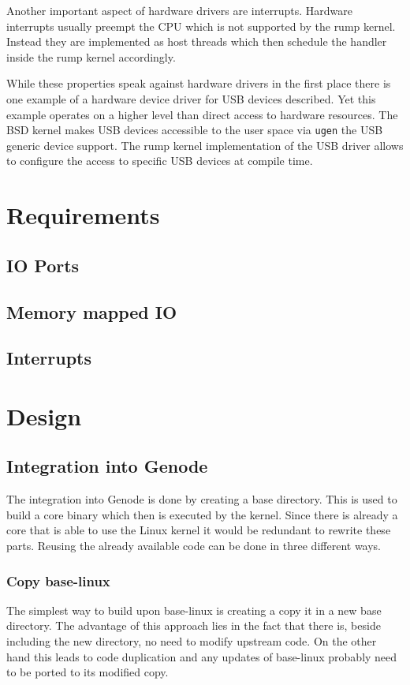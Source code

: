 \documentclass[
a4paper,
12pt,
notitlepage,
parskip=half,
DIV=11,
]{scrbook}
\begin{document}
		Another important aspect of hardware drivers are interrupts.
		Hardware interrupts usually preempt the CPU which is not supported by the rump kernel.
		Instead they are implemented as host threads which then schedule the handler inside the rump kernel accordingly. \citep{kantee}
		
		While these properties speak against hardware drivers in the first place there is one example of a hardware device driver for USB devices described.
		Yet this example operates on a higher level than direct access to hardware resources.
		The BSD kernel makes USB devices accessible to the user space via \texttt{ugen} the USB generic device support.
		The rump kernel implementation of the USB driver allows to configure the access to specific USB devices at compile time. \citep{kantee} \citep{ugen}
		
	\chapter{Requirements} %
	
	\section{IO Ports}
	
	\section{Memory mapped IO}
	
	\section{Interrupts}
	
	
	\chapter{Design}
	
		\section{Integration into Genode}
		The integration into Genode is done by creating a base directory.
		This is used to build a core binary which then is executed by the kernel.
		Since there is already a core that is able to use the Linux kernel it would be redundant to rewrite these parts.
		Reusing the already available code can be done in three different ways.
	
		\subsection{Copy base-linux}
		The simplest way to build upon base-linux is creating a copy it in a new base directory.
		The advantage of this approach lies in the fact that there is, beside including the new directory, no need to modify upstream code.
		On the other hand this leads to code duplication and any updates of base-linux probably need to be ported to its modified copy.
	
\end{document}
